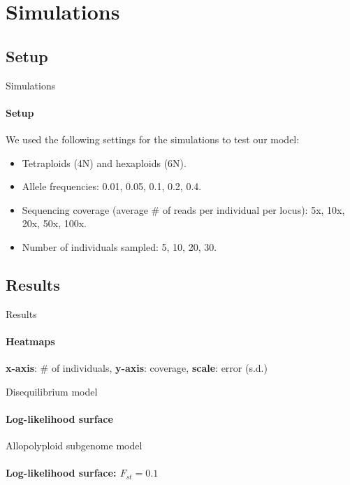 \documentclass[presentation,sansserif]{beamer}
\begin{document}
\section{Simulations}

\subsection{Setup}

\begin{frame}[t]{Simulations}
	\framesubtitle{Setup}

	We used the following settings for the simulations to test our model:
	\vspace{0.1in}

	\begin{itemize}
		\item Tetraploids (4N) and hexaploids (6N).
		\item Allele frequencies: 0.01, 0.05, 0.1, 0.2, 0.4.
		\item Sequencing coverage (average \# of reads per individual per locus): 5x, 10x, 20x, 50x, 100x.
		\item Number of individuals sampled: 5, 10, 20, 30.
	\end{itemize}
\end{frame}

\subsection{Results}

\begin{frame}[c]{Results}
	\framesubtitle{Heatmaps}
	\textbf{x-axis}: \# of individuals, \textbf{y-axis}: coverage, \textbf{scale}: error (s.d.)
	\pause
	\begin{center}
	\end{center}
\end{frame}

{ 
\begin{frame}[c,plain]{Disequilibrium model}
	\framesubtitle{Log-likelihood surface}
	\begin{center}
	\end{center}
\end{frame}
}

{  %
\begin{frame}[c,plain]{Allopolyploid subgenome model}
	\framesubtitle{Log-likelihood surface: $F_{st}=0.1$}
	\begin{center}
	\end{center}
\end{frame}
}
\end{document}
